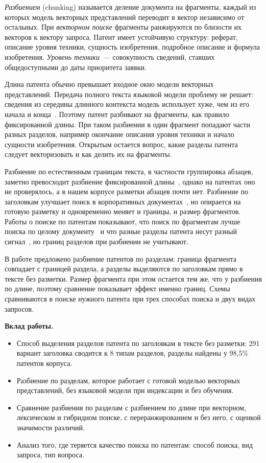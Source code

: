 \documentclass{article}
\begin{document}
\emph{Разбиением} (chunking) называется деление документа на фрагменты, каждый из которых модель векторных представлений переводит в вектор независимо от остальных. При \emph{векторном поиске} фрагменты ранжируются по близости их векторов к вектору запроса. Патент имеет устойчивую структуру: реферат, описание уровня техники, сущность изобретения, подробное описание и формула изобретения. \emph{Уровень техники}~--- совокупность сведений, ставших общедоступными до даты приоритета заявки.

Длина патента обычно превышает входное окно модели векторных представлений. Передача полного текста языковой модели проблему не решает: сведения из середины длинного контекста модель использует хуже, чем из его начала и конца~\citep{liu2024lost}. Поэтому патент разбивают на фрагменты, как правило фиксированной длины. При таком разбиении в один фрагмент попадают части разных разделов, например окончание описания уровня техники и начало сущности изобретения. Открытым остается вопрос, какие разделы патента следует векторизовать и как делить их на фрагменты.

Разбиение по естественным границам текста, в частности группировка абзацев, заметно превосходит разбиение фиксированной длины~\citep{shaukat2026chunking}, однако на патентах оно не проверялось, а в нашем корпусе разметки абзацев почти нет. Разбиение по заголовкам улучшает поиск в корпоративных документах~\citep{taiwo2026oilgas}, но опирается на готовую разметку и одновременно меняет и границы, и размер фрагментов. Работы о поиске по патентам показывают, что поиск по фрагментам лучше поиска по целому документу~\citep{ayaou2025dapfam} и что разные разделы патента несут разный сигнал~\citep{zuo2026patent,kamateri2025summarization}, но границ разделов при разбиении не учитывают.

В работе предложено разбиение патентов по разделам: граница фрагмента совпадает с границей раздела, а разделы выделяются по заголовкам прямо в тексте без разметки. Размер фрагмента при этом остается тем же, что у разбиения по длине, поэтому сравнение показывает эффект именно границ. Схемы сравниваются в поиске нужного патента при трех способах поиска и двух видах запросов.

\textbf{Вклад работы.}
\begin{itemize}
    \item Способ выделения разделов патента по заголовкам в тексте без разметки: 291 вариант заголовка сводится к 8 типам разделов, разделы найдены у 98,5\% патентов корпуса.
    \item Разбиение по разделам, которое работает с готовой моделью векторных представлений, без языковой модели при индексации и без обучения.
    \item Сравнение разбиения по разделам с разбиением по длине при векторном, лексическом и гибридном поиске, с переранжированием и без него, с оценкой значимости различий.
    \item Анализ того, где теряется качество поиска по патентам: способ поиска, вид запроса, тип вопроса.
\end{itemize}
\end{document}
